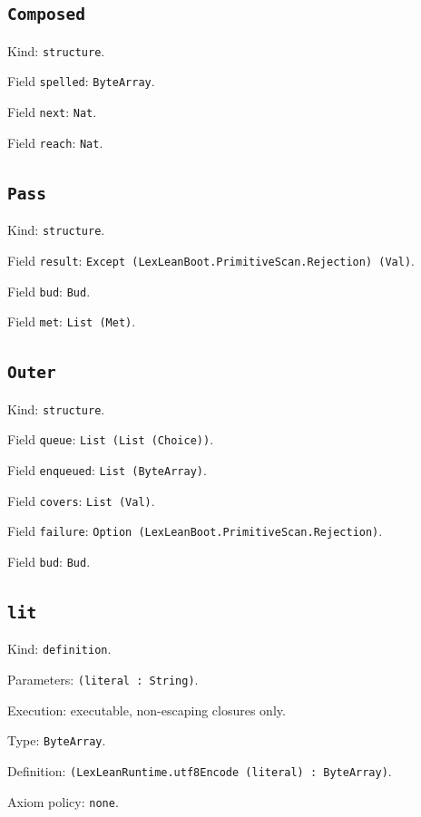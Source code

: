 \documentclass[11pt]{article}
\begin{document}
\subsection*{\texttt{Composed}}
\noindent Kind: \texttt{structure}.\par
\noindent Field \texttt{spelled}: \texttt{ByteArray}.\par
\noindent Field \texttt{next}: \texttt{Nat}.\par
\noindent Field \texttt{reach}: \texttt{Nat}.\par
\subsection*{\texttt{Pass}}
\noindent Kind: \texttt{structure}.\par
\noindent Field \texttt{result}: \texttt{Except (LexLeanBoot.PrimitiveScan.Rejection) (Val)}.\par
\noindent Field \texttt{bud}: \texttt{Bud}.\par
\noindent Field \texttt{met}: \texttt{List (Met)}.\par
\subsection*{\texttt{Outer}}
\noindent Kind: \texttt{structure}.\par
\noindent Field \texttt{queue}: \texttt{List (List (Choice))}.\par
\noindent Field \texttt{enqueued}: \texttt{List (ByteArray)}.\par
\noindent Field \texttt{covers}: \texttt{List (Val)}.\par
\noindent Field \texttt{failure}: \texttt{Option (LexLeanBoot.PrimitiveScan.Rejection)}.\par
\noindent Field \texttt{bud}: \texttt{Bud}.\par
\subsection*{\texttt{lit}}
\noindent Kind: \texttt{definition}.\par
\noindent Parameters: \texttt{(literal : String)}.\par
\noindent Execution: executable, non-escaping closures only.\par
\noindent Type: \texttt{ByteArray}.\par
\noindent Definition: \texttt{(LexLeanRuntime.utf8Encode (literal) : ByteArray)}.\par
\noindent Axiom policy: \texttt{none}.\par
\end{document}
